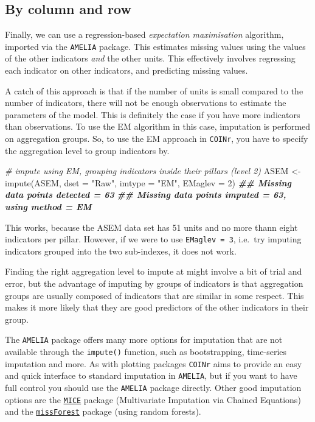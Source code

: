 \documentclass[
]{book}
\newenvironment{Shaded}{\begin{snugshade}}{\end{snugshade}}
\newcommand{\AttributeTok}[1]{\textcolor[rgb]{0.77,0.63,0.00}{#1}}
\newcommand{\CommentTok}[1]{\textcolor[rgb]{0.56,0.35,0.01}{\textit{#1}}}
\newcommand{\DecValTok}[1]{\textcolor[rgb]{0.00,0.00,0.81}{#1}}
\newcommand{\DocumentationTok}[1]{\textcolor[rgb]{0.56,0.35,0.01}{\textbf{\textit{#1}}}}
\newcommand{\FunctionTok}[1]{\textcolor[rgb]{0.00,0.00,0.00}{#1}}
\newcommand{\NormalTok}[1]{#1}
\newcommand{\OtherTok}[1]{\textcolor[rgb]{0.56,0.35,0.01}{#1}}
\newcommand{\StringTok}[1]{\textcolor[rgb]{0.31,0.60,0.02}{#1}}
\begin{document}
\hypertarget{by-column-and-row}{%
\subsection{By column and row}\label{by-column-and-row}}

Finally, we can use a regression-based \emph{expectation maximisation} algorithm, imported via the \texttt{AMELIA} package. This estimates missing values using the values of the other indicators \emph{and} the other units. This effectively involves regressing each indicator on other indicators, and predicting missing values.

A catch of this approach is that if the number of units is small compared to the number of indicators, there will not be enough observations to estimate the parameters of the model. This is definitely the case if you have more indicators than observations. To use the EM algorithm in this case, imputation is performed on aggregation groups. So, to use the EM approach in \texttt{COINr}, you have to specify the aggregation level to group indicators by.

\begin{Shaded}
\begin{Highlighting}[]
\CommentTok{\# impute using EM, grouping indicators inside their pillars (level 2)}
\NormalTok{ASEM }\OtherTok{\textless{}{-}} \FunctionTok{impute}\NormalTok{(ASEM, }\AttributeTok{dset =} \StringTok{"Raw"}\NormalTok{, }\AttributeTok{imtype =} \StringTok{"EM"}\NormalTok{, }\AttributeTok{EMaglev =} \DecValTok{2}\NormalTok{)}
\DocumentationTok{\#\# Missing data points detected = 63}
\DocumentationTok{\#\# Missing data points imputed = 63, using method = EM}
\end{Highlighting}
\end{Shaded}

This works, because the ASEM data set has 51 units and no more thann eight indicators per pillar. However, if we were to use \texttt{EMaglev\ =\ 3}, i.e.~try imputing indicators grouped into the two sub-indexes, it does not work.

Finding the right aggregation level to impute at might involve a bit of trial and error, but the advantage of imputing by groups of indicators is that aggregation groups are usually composed of indicators that are similar in some respect. This makes it more likely that they are good predictors of the other indicators in their group.

The \texttt{AMELIA} package offers many more options for imputation that are not available through the \texttt{impute()} function, such as bootstrapping, time-series imputation and more. As with plotting packages \texttt{COINr} aims to provide an easy and quick interface to standard imputation in \texttt{AMELIA}, but if you want to have full control you should use the \texttt{AMELIA} package directly. Other good imputation options are the \href{https://cran.r-project.org/web/packages/mice/index.html}{\texttt{MICE}} package (Multivariate Imputation via Chained Equations) and the \href{https://cran.rstudio.com/web/packages/missForest/index.html}{\texttt{missForest}} package (using random forests).
\end{document}
